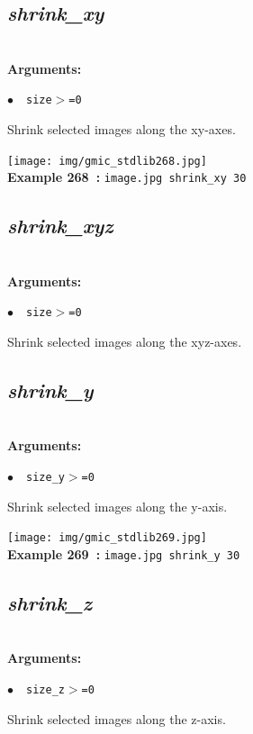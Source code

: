 \documentclass[a4paper,10.5pt,twoside]{book}
\newcommand{\Cb}[1]{\textcolor{cb}{#1}}
\begin{document}
\subsection{\emph{shrink\_xy} }\vspace*{-0.7em}
~\\\textbf{\Cb{Arguments: }}\begin{flushleft}
{\small \Cb{\hspace*{0.5cm}$\bullet$~~\texttt{size$>$=0}}}\end{flushleft}
Shrink selected images along the xy-axes.
\begin{center}\texttt{[image: img/gmic\_stdlib268.jpg]}\\
{\footnotesize \textbf{Example 268~:} \texttt{image.jpg shrink\_xy 30}}
\end{center}

\subsection{\emph{shrink\_xyz} }\vspace*{-0.7em}
~\\\textbf{\Cb{Arguments: }}\begin{flushleft}
{\small \Cb{\hspace*{0.5cm}$\bullet$~~\texttt{size$>$=0}}}\end{flushleft}
Shrink selected images along the xyz-axes.


\subsection{\emph{shrink\_y} }\vspace*{-0.7em}
~\\\textbf{\Cb{Arguments: }}\begin{flushleft}
{\small \Cb{\hspace*{0.5cm}$\bullet$~~\texttt{size\_y$>$=0}}}\end{flushleft}
Shrink selected images along the y-axis.
\begin{center}\texttt{[image: img/gmic\_stdlib269.jpg]}\\
{\footnotesize \textbf{Example 269~:} \texttt{image.jpg shrink\_y 30}}
\end{center}

\subsection{\emph{shrink\_z} }\vspace*{-0.7em}
~\\\textbf{\Cb{Arguments: }}\begin{flushleft}
{\small \Cb{\hspace*{0.5cm}$\bullet$~~\texttt{size\_z$>$=0}}}\end{flushleft}
Shrink selected images along the z-axis.
\end{document}

